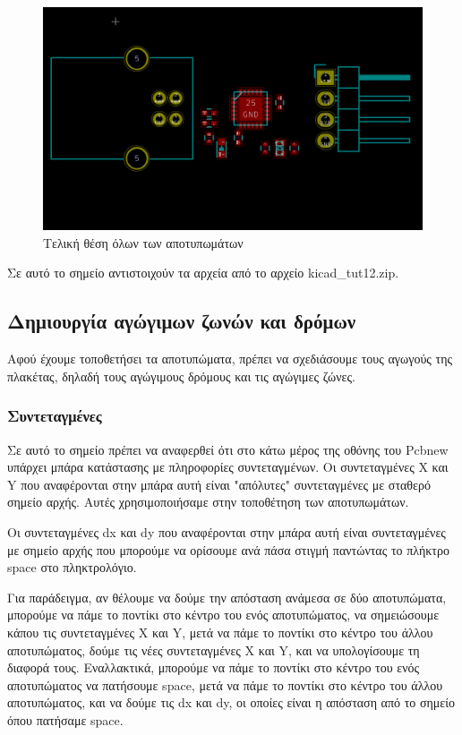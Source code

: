 \documentclass[a4paper]{article}
\begin{document}
 \begin{figure}
  \begin{center}
    \includegraphics[width=.9\textwidth]{img/pcb-circ-allmod.png}
    \caption{Τελική θέση όλων των αποτυπωμάτων}
    \label{fig:pcb-circ-allmod}
  \end{center}
\end{figure}

Σε αυτό το σημείο αντιστοιχούν τα αρχεία από το αρχείο kicad\_tut12.zip.

\subsection{Δημιουργία αγώγιμων ζωνών και δρόμων}
Αφού έχουμε τοποθετήσει τα αποτυπώματα, πρέπει να σχεδιάσουμε τους αγωγούς της πλακέτας, δηλαδή τους αγώγιμους δρόμους και τις αγώγιμες ζώνες.

\subsubsection{Συντεταγμένες}
Σε αυτό το σημείο πρέπει να αναφερθεί ότι στο κάτω μέρος της οθόνης του Pcbnew υπάρχει μπάρα κατάστασης με πληροφορίες συντεταγμένων. Οι συντεταγμένες X και Y που αναφέρονται στην μπάρα αυτή είναι "απόλυτες" συντεταγμένες με σταθερό σημείο αρχής. Αυτές χρησιμοποιήσαμε στην τοποθέτηση των αποτυπωμάτων. 

Οι συντεταγμένες dx και dy που αναφέρονται στην μπάρα αυτή είναι συντεταγμένες με σημείο αρχής που μπορούμε να ορίσουμε ανά πάσα στιγμή παντώντας το πλήκτρο space στο πληκτρολόγιο. 

Για παράδειγμα, αν θέλουμε να δούμε την απόσταση ανάμεσα σε δύο αποτυπώματα, μπορούμε να πάμε το ποντίκι στο κέντρο του ενός αποτυπώματος, να σημειώσουμε κάπου τις συντεταγμένες X και Y, μετά να πάμε το ποντίκι στο κέντρο του άλλου αποτυπώματος, δούμε τις νέες συντεταγμένες X και Y, και να υπολογίσουμε τη διαφορά τους. Εναλλακτικά, μπορούμε να πάμε το ποντίκι στο κέντρο του ενός αποτυπώματος να πατήσουμε space, μετά να πάμε το ποντίκι στο κέντρο του άλλου αποτυπώματος, και να δούμε τις dx και dy, οι οποίες είναι η απόσταση από το σημείο όπου πατήσαμε space.
\end{document}
